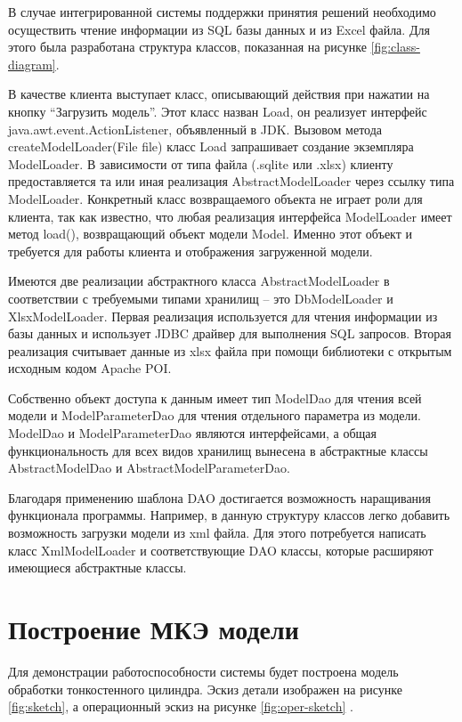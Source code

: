 \documentclass[14pt,oneside,final]{extreport}
\begin{document}
	
	В случае интегрированной системы поддержки принятия решений необходимо осуществить чтение информации из SQL базы данных и из Excel файла. Для этого была разработана структура классов, показанная на рисунке \ref{fig:class-diagram}.
	
	В качестве клиента выступает класс, описывающий действия при нажатии на кнопку ``Загрузить модель''. Этот класс назван Load, он реализует интерфейс java.awt.event.ActionListener, объявленный в JDK. Вызовом метода createModelLoader(File file) класс Load запрашивает создание экземпляра ModelLoader. В зависимости от типа файла (.sqlite или .xlsx) клиенту предоставляется та или иная реализация AbstractModelLoader через ссылку типа ModelLoader. Конкретный класс возвращаемого объекта не играет роли для клиента, так как известно, что любая реализация интерфейса ModelLoader имеет метод load(), возвращающий объект модели Model. Именно этот объект и требуется для работы клиента и отображения загруженной модели. 
	
	Имеются две реализации абстрактного класса AbstractModelLoader в соответствии с требуемыми типами хранилищ -- это DbModelLoader и XlsxModelLoader. Первая реализация используется для чтения информации из базы данных и использует JDBC драйвер для выполнения SQL запросов. Вторая реализация считывает данные из xlsx файла при помощи библиотеки с открытым исходным кодом Apache POI. 
	
	Собственно объект доступа к данным имеет тип ModelDao для чтения всей модели и ModelParameterDao для чтения отдельного параметра из модели. ModelDao и ModelParameterDao являются интерфейсами, а общая функциональность для всех видов хранилищ вынесена в абстрактные классы AbstractModelDao и AbstractModelParameterDao.  
	
	Благодаря применению шаблона DAO достигается возможность наращивания функционала программы. Например, в данную структуру классов легко добавить возможность загрузки модели из xml файла. Для этого потребуется написать класс XmlModelLoader и соответствующие DAO классы, которые расширяют имеющиеся абстрактные классы. 
	
	\section{Построение МКЭ модели}
	Для демонстрации работоспособности системы будет построена модель обработки тонкостенного цилиндра.  Эскиз детали изображен на рисунке \ref{fig:sketch}, а операционный эскиз на рисунке \ref{fig:oper-sketch} .
	
\end{document}
